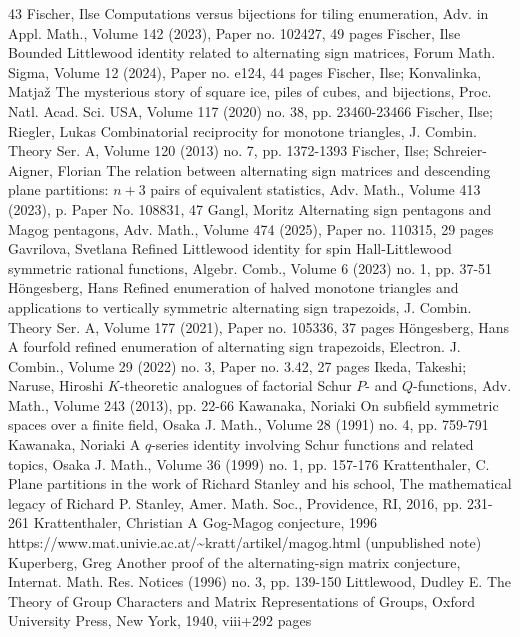 \begin{thebibliography}{43}
 Fischer, Ilse Computations versus bijections for tiling enumeration, Adv. in Appl. Math., Volume 142 (2023), Paper no. 102427, 49 pages
 Fischer, Ilse Bounded Littlewood identity related to alternating sign matrices, Forum Math. Sigma, Volume 12 (2024), Paper no. e124, 44 pages
 Fischer, Ilse; Konvalinka, Matjaž The mysterious story of square ice, piles of cubes, and bijections, Proc. Natl. Acad. Sci. USA, Volume 117 (2020) no. 38, pp. 23460-23466
 Fischer, Ilse; Riegler, Lukas Combinatorial reciprocity for monotone triangles, J. Combin. Theory Ser. A, Volume 120 (2013) no. 7, pp. 1372-1393
 Fischer, Ilse; Schreier-Aigner, Florian The relation between alternating sign matrices and descending plane partitions: $n + 3$ pairs of equivalent statistics, Adv. Math., Volume 413 (2023), p. Paper No. 108831, 47
 Gangl, Moritz Alternating sign pentagons and Magog pentagons, Adv. Math., Volume 474 (2025), Paper no. 110315, 29 pages
 Gavrilova, Svetlana Refined Littlewood identity for spin Hall-Littlewood symmetric rational functions, Algebr. Comb., Volume 6 (2023) no. 1, pp. 37-51
 Höngesberg, Hans Refined enumeration of halved monotone triangles and applications to vertically symmetric alternating sign trapezoids, J. Combin. Theory Ser. A, Volume 177 (2021), Paper no. 105336, 37 pages
 Höngesberg, Hans A fourfold refined enumeration of alternating sign trapezoids, Electron. J. Combin., Volume 29 (2022) no. 3, Paper no. 3.42, 27 pages
 Ikeda, Takeshi; Naruse, Hiroshi ${K}$-theoretic analogues of factorial Schur ${P}$- and ${Q}$-functions, Adv. Math., Volume 243 (2013), pp. 22-66
 Kawanaka, Noriaki On subfield symmetric spaces over a finite field, Osaka J. Math., Volume 28 (1991) no. 4, pp. 759-791
 Kawanaka, Noriaki A $q$-series identity involving Schur functions and related topics, Osaka J. Math., Volume 36 (1999) no. 1, pp. 157-176
 Krattenthaler, C. Plane partitions in the work of Richard Stanley and his school, The mathematical legacy of Richard P. Stanley, Amer. Math. Soc., Providence, RI, 2016, pp. 231-261
 Krattenthaler, Christian A Gog-Magog conjecture, 1996 https://www.mat.univie.ac.at/\textasciitilde{}kratt/artikel/magog.html (unpublished note)
 Kuperberg, Greg Another proof of the alternating-sign matrix conjecture, Internat. Math. Res. Notices (1996) no. 3, pp. 139-150
 Littlewood, Dudley E. The Theory of Group Characters and Matrix Representations of Groups, Oxford University Press, New York, 1940, viii+292 pages

\end{thebibliography}
